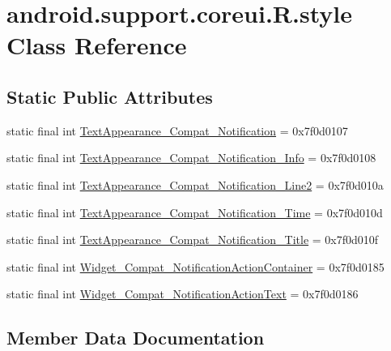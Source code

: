 \hypertarget{classandroid_1_1support_1_1coreui_1_1R_1_1style}{}\section{android.\+support.\+coreui.\+R.\+style Class Reference}
\label{classandroid_1_1support_1_1coreui_1_1R_1_1style}
\subsection*{Static Public Attributes}
\begin{DoxyCompactItemize}
\item 
static final int \mbox{\hyperlink{classandroid_1_1support_1_1coreui_1_1R_1_1style_a0c6b96d4834665690ae4c899c1a719b6}{Text\+Appearance\+\_\+\+Compat\+\_\+\+Notification}} = 0x7f0d0107
\item 
static final int \mbox{\hyperlink{classandroid_1_1support_1_1coreui_1_1R_1_1style_aeba3bd71a8d96781afc4e9d8472481a7}{Text\+Appearance\+\_\+\+Compat\+\_\+\+Notification\+\_\+\+Info}} = 0x7f0d0108
\item 
static final int \mbox{\hyperlink{classandroid_1_1support_1_1coreui_1_1R_1_1style_aa5854ca296a9a914fa7c186893f8829c}{Text\+Appearance\+\_\+\+Compat\+\_\+\+Notification\+\_\+\+Line2}} = 0x7f0d010a
\item 
static final int \mbox{\hyperlink{classandroid_1_1support_1_1coreui_1_1R_1_1style_a835fb788c494447369e61d6839eecda1}{Text\+Appearance\+\_\+\+Compat\+\_\+\+Notification\+\_\+\+Time}} = 0x7f0d010d
\item 
static final int \mbox{\hyperlink{classandroid_1_1support_1_1coreui_1_1R_1_1style_a9d3e3f2d92a2b4fe044b5a3047f36d19}{Text\+Appearance\+\_\+\+Compat\+\_\+\+Notification\+\_\+\+Title}} = 0x7f0d010f
\item 
static final int \mbox{\hyperlink{classandroid_1_1support_1_1coreui_1_1R_1_1style_a43c6e7497150331f8f7d0863365c5478}{Widget\+\_\+\+Compat\+\_\+\+Notification\+Action\+Container}} = 0x7f0d0185
\item 
static final int \mbox{\hyperlink{classandroid_1_1support_1_1coreui_1_1R_1_1style_a5b59f4ac1e5a41d79c19894c963d7f7a}{Widget\+\_\+\+Compat\+\_\+\+Notification\+Action\+Text}} = 0x7f0d0186
\end{DoxyCompactItemize}


\subsection{Member Data Documentation}
\mbox{\label{classandroid_1_1support_1_1coreui_1_1R_1_1style_a0c6b96d4834665690ae4c899c1a719b6}} 
